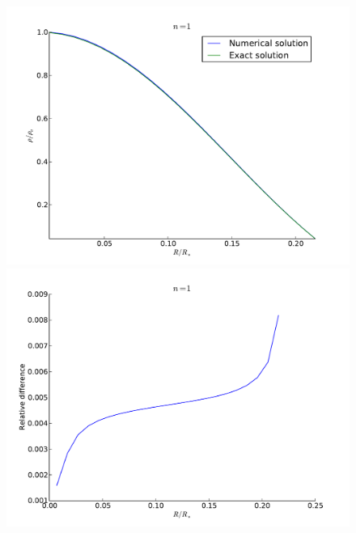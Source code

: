 \documentclass[11pt,letterpaper]{article}
\begin{document}
\begin{figure}
    \centering
    \begin{minipage}[t]{0.496\textwidth}
        \centering
        \includegraphics[width=\textwidth]{figures/poly1.pdf}
    \end{minipage}
    \begin{minipage}[t]{0.496\textwidth}
        \centering
        \includegraphics[width=\textwidth]{figures/poly1_err.pdf}
    \end{minipage}
    \begin{minipage}[t]{0.496\textwidth}
        \centering

\end{minipage}
\end{figure}
\end{document}
